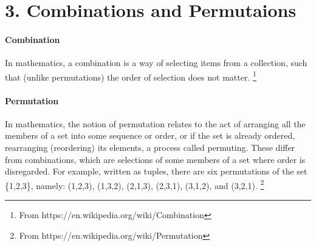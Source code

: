 \documentclass[a4paper,12pt]{book}
\begin{document}
    \section*{3. Combinations and Permutaions}

        \begin{introNOHEAD}
            \paragraph{Combination}
                In mathematics, a combination is a way of selecting items from a collection,
                such that (unlike permutations) the order of selection does not matter.
                \footnote{From https://en.wikipedia.org/wiki/Combination}
                
            \paragraph{Permutation}
                In mathematics, the notion of permutation relates to the act of arranging
                all the members of a set into some sequence or order, or if the set is already ordered,
                rearranging (reordering) its elements, a process called permuting. These differ from combinations,
                which are selections of some members of a set where order is disregarded. For example, written as tuples,
                there are six permutations of the set \{1,2,3\}, namely: (1,2,3), (1,3,2), (2,1,3), (2,3,1), (3,1,2), and
                (3,2,1).
                \footnote{From https://en.wikipedia.org/wiki/Permutation}
        \end{introNOHEAD}
\end{document}
